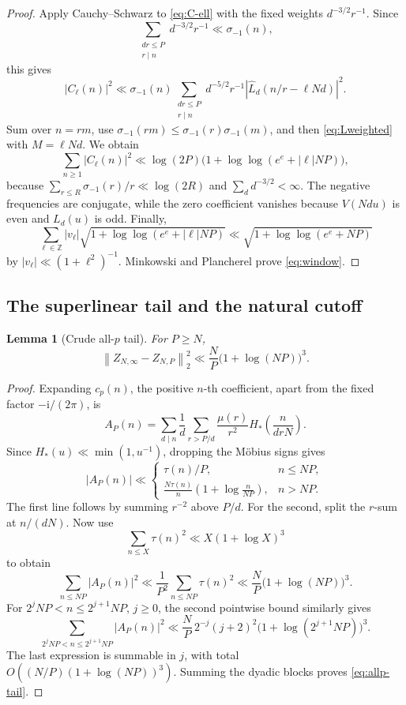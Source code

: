 \documentclass[11pt]{article}
\numberwithin{equation}{section}
\newtheorem{lemma}[theorem]{Lemma}
\theoremstyle{definition}
\newcommand{\Z}{\mathbb Z}
\newcommand{\1}{\mathbf 1}
\newcommand{\ii}{\mathrm i}
\newcommand{\norm}[1]{\left\lVert#1\right\rVert}
\begin{document}
\begin{proof}
Apply Cauchy--Schwarz to \eqref{eq:C-ell} with the fixed weights
\(d^{-3/2}r^{-1}\).  Since
\[
 \sum_{\substack{dr\le P\\r\mid n}}d^{-3/2}r^{-1}
 \ll\sigma_{-1}(n),
\]
this gives
\[
 |C_\ell(n)|^2
 \ll \sigma_{-1}(n)
 \sum_{\substack{dr\le P\\r\mid n}}
 d^{-5/2}r^{-1}
 \left|\widehat L_d(n/r-\ell Nd)\right|^2.
\]
Sum over \(n=rm\), use
\(\sigma_{-1}(rm)\le\sigma_{-1}(r)\sigma_{-1}(m)\), and then
\eqref{eq:Lweighted} with \(M=\ell Nd\).  We obtain
\[
 \sum_{n\ge1}|C_\ell(n)|^2
 \ll
 \log(2P)\bigl(1+\log\log(e^e+|\ell|NP)\bigr),
\]
because
\(\sum_{r\le R}\sigma_{-1}(r)/r\ll\log(2R)\) and
\(\sum_d d^{-3/2}<\infty\).
The negative frequencies are conjugate, while the zero coefficient
vanishes because \(V(Ndu)\) is even and \(L_d(u)\) is odd.
Finally,
\[
 \sum_{\ell\in\Z}|v_\ell|
 \sqrt{1+\log\log(e^e+|\ell|NP)}
 \ll
 \sqrt{1+\log\log(e^e+NP)}
\]
by \(|v_\ell|\ll(1+\ell^2)^{-1}\).  Minkowski and Plancherel
prove \eqref{eq:window}.
\end{proof}

\subsection{The superlinear tail and the natural cutoff}

\begin{lemma}[Crude all-\(p\) tail]\label{lem:allp-tail}
For \(P\ge N\),
\begin{equation}\label{eq:allp-tail}
 \norm{Z_{N,\infty}-Z_{N,P}}_2^2
 \ll \frac NP\bigl(1+\log(NP)\bigr)^3.
\end{equation}
\end{lemma}

\begin{proof}
Expanding \(c_p(n)\), the positive \(n\)-th coefficient, apart from
the fixed factor \(-\ii/(2\pi)\), is
\[
 A_P(n)=
 \sum_{d\mid n}\frac1d
 \sum_{r>P/d}\frac{\mu(r)}{r^2}
 H_*\left(\frac{n}{drN}\right).
\]
Since \(H_*(u)\ll\min(1,u^{-1})\), dropping the Möbius signs gives
\[
 |A_P(n)|\ll
 \begin{cases}
 \tau(n)/P,&n\le NP,\\[2mm]
 \displaystyle
 \frac{N\tau(n)}n\left(1+\log\frac{n}{NP}\right),&n>NP.
 \end{cases}
\]
The first line follows by summing \(r^{-2}\) above \(P/d\).
For the second, split the \(r\)-sum at \(n/(dN)\).  Now use
\[
 \sum_{n\le X}\tau(n)^2\ll X(1+\log X)^3
\]
to obtain
\[
 \sum_{n\le NP}|A_P(n)|^2
 \ll \frac1{P^2}\sum_{n\le NP}\tau(n)^2
 \ll \frac NP\bigl(1+\log(NP)\bigr)^3.
\]
For \(2^jNP<n\le2^{j+1}NP\), \(j\ge0\), the second pointwise
bound similarly gives
\[
 \sum_{2^jNP<n\le2^{j+1}NP}|A_P(n)|^2
 \ll \frac NP\,2^{-j}(j+2)^2
       \bigl(1+\log(2^{j+1}NP)\bigr)^3.
\]
The last expression is summable in \(j\), with total
\(O((N/P)(1+\log(NP))^3)\).  Summing the dyadic blocks proves
\eqref{eq:allp-tail}.
\end{proof}
\end{document}
